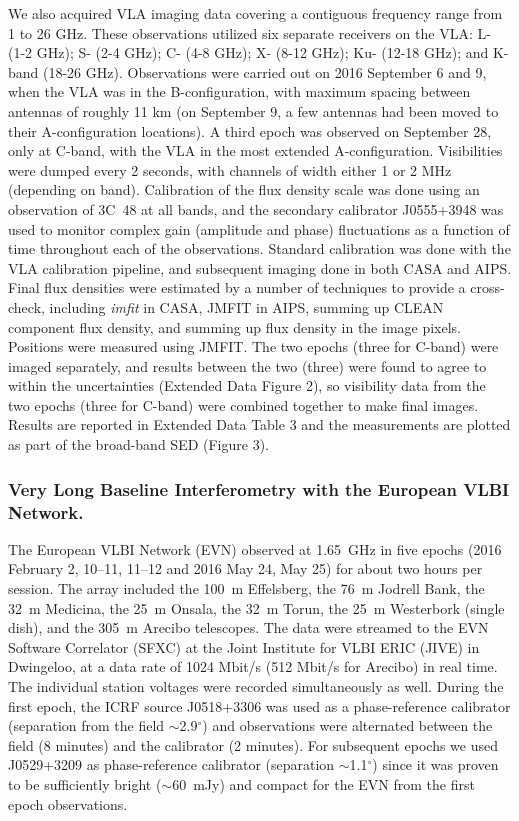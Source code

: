 \documentclass{nature_frb}
\newcommand{\degree}{\ensuremath{^\circ}}
\begin{document}
We also acquired VLA imaging data covering a contiguous frequency range from 1 to 26 GHz. These observations utilized six separate receivers on the VLA: L- (1-2 GHz); S- (2-4 GHz); C- (4-8 GHz); X- (8-12 GHz); Ku- (12-18 GHz); and K-band (18-26 GHz). Observations were carried out on 2016 September 6 and 9, when the VLA was in the B-configuration, with maximum spacing between antennas of roughly 11 km (on September 9, a few antennas had been moved to their A-configuration locations).
A third epoch was observed on September 28, only at C-band, with the VLA in the most extended A-configuration.
Visibilities were dumped every 2 seconds, with channels of width either 1 or 2 MHz (depending on band). Calibration of the flux density scale was done using an
observation of 3C~48 at all bands\cite{pb13}, and the secondary calibrator J0555+3948 was used to monitor complex gain (amplitude and phase) fluctuations as a function of time throughout each of the observations. Standard calibration was done with the VLA calibration pipeline, and subsequent imaging done in both CASA and AIPS. Final flux densities were estimated by a number of techniques to provide a cross-check, including {\em imfit} in CASA, JMFIT in AIPS, summing up CLEAN component flux density, and summing up flux density in the image pixels. Positions were measured using JMFIT.
The two epochs (three for C-band) were imaged separately, and results between the two (three) were found to agree to within the uncertainties (Extended Data Figure 2), so visibility data from the two epochs (three for C-band) were combined together to make final images. Results are reported in Extended Data Table 3 and the measurements are plotted as part of the broad-band SED (Figure 3).

\subsubsection*{Very Long Baseline Interferometry with the European VLBI Network.}
The European VLBI Network (EVN) observed at 1.65~GHz in five epochs (2016 February 2, 10--11, 11--12 and 2016 May 24, May 25) for about two hours per session. The array included the 100~m Effelsberg, the 76~m Jodrell Bank, the 32~m Medicina, the 25~m Onsala, the 32~m Torun, the 25~m Westerbork (single dish), and the 305~m Arecibo telescopes. The data were streamed to the EVN Software Correlator (SFXC) at the Joint Institute for VLBI ERIC (JIVE) in Dwingeloo, at a data rate of 1024 Mbit/s (512 Mbit/s for Arecibo) in real time. The individual station voltages were recorded simultaneously as well. During the first epoch, the
ICRF source J0518+3306 was used as a phase-reference calibrator (separation from the field $\sim$2.9\degree) and observations were alternated between the field (8 minutes) and the calibrator (2 minutes). For subsequent epochs we used J0529+3209 as phase-reference calibrator (separation $\sim$1.1\degree) since it was proven to be sufficiently bright ($\sim$60~mJy) and compact for the EVN from the first epoch observations.
\end{document}
